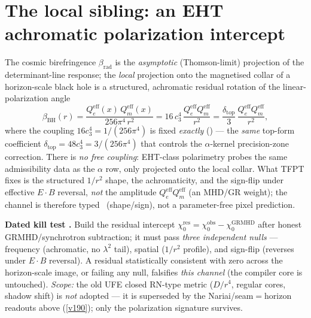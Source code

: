 \documentclass[11pt,a4paper]{article}
\newcommand{\cthree}{c_3}
\begin{document}
\section{The local sibling: an EHT achromatic polarization intercept}
The cosmic birefringence $\beta_{\mathrm{rad}}$ is the \emph{asymptotic} (Thomson-limit) projection of the
determinant-line response; the \emph{local} projection onto the magnetised collar of a horizon-scale black
hole is a structured, achromatic residual rotation of the linear-polarization angle 
\[
  \beta_{\mathrm{BH}}(r)=\frac{Q_e^{\mathrm{eff}}(x)\,Q_m^{\mathrm{eff}}(x)}{256\pi^4\,r^2}
  =16\,\cthree^4\,\frac{Q_e^{\mathrm{eff}}Q_m^{\mathrm{eff}}}{r^2}
  =\frac{\delta_{\mathrm{top}}}{3}\,\frac{Q_e^{\mathrm{eff}}Q_m^{\mathrm{eff}}}{r^2},
\]
where the coupling $16\cthree^4=1/(256\pi^4)$ is fixed \emph{exactly} (\mE) --- the \emph{same} top-form
coefficient $\delta_{\mathrm{top}}=48\cthree^4=3/(256\pi^4)$ that controls the $\alpha$-kernel
precision-zone correction. There is \emph{no free coupling}: EHT-class polarimetry probes the same
admissibility data as the $\alpha$ row, only projected onto the local collar. What TFPT fixes is the
structured $1/r^2$ shape, the achromaticity, and the sign-flip under effective $E\!\cdot\!B$ reversal,
\emph{not} the amplitude $Q_e^{\mathrm{eff}}Q_m^{\mathrm{eff}}$ (an MHD/GR weight); the channel is therefore
typed \mC\ (shape/sign), not a parameter-free pixel prediction.
\par\smallskip\noindent\textbf{Dated kill test \mX.} Build the residual intercept
$\chi_0^{\mathrm{res}}=\chi_0^{\mathrm{obs}}-\chi_0^{\mathrm{GRMHD}}$ after honest GRMHD/synchrotron
subtraction; it must pass \emph{three independent nulls} --- frequency (achromatic, no $\lambda^2$ tail),
spatial ($1/r^2$ profile), and sign-flip (reverses under $E\!\cdot\!B$ reversal). A residual statistically
consistent with zero across the horizon-scale image, or failing any null, falsifies \emph{this channel}
(the compiler core is untouched). \emph{Scope:} the old UFE closed RN-type metric ($D/r^4$, regular cores,
shadow shift) is \emph{not} adopted --- it is superseded by the Nariai/seam$=$horizon readouts above
(\vref{v190}); only the polarization signature survives.

\end{document}
